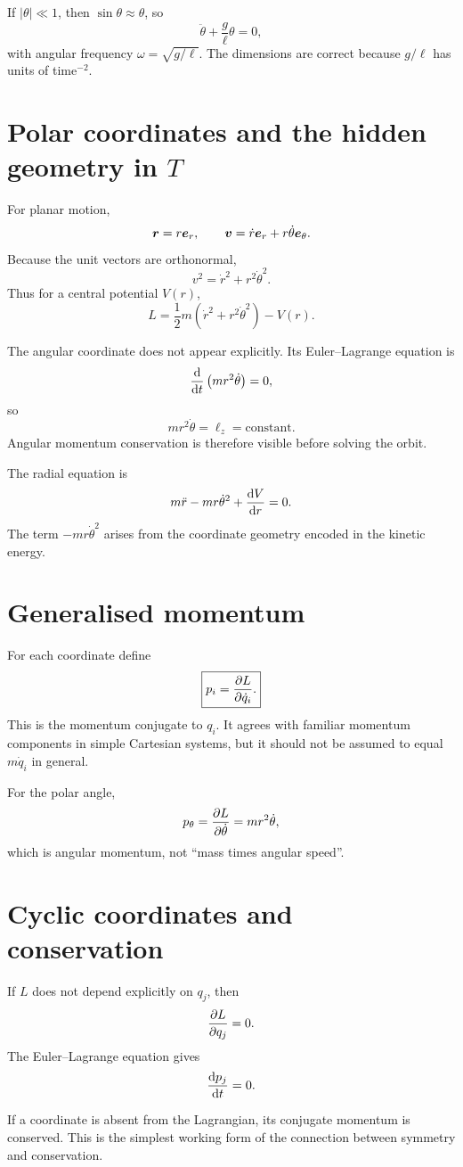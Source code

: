 \documentclass[11pt,a4paper]{article}
\begin{document}
\begin{checkBox}
If $|\theta|\ll1$, then $\sin\theta\approx\theta$, so
\[
\ddot\theta+\frac g\ell\theta=0,
\]
with angular frequency $\omega=\sqrt{g/\ell}$. The dimensions are correct because $g/\ell$ has units of time$^{-2}$.
\end{checkBox}

\section{Polar coordinates and the hidden geometry in $T$}

For planar motion,
\[
\bm{r}=r\bm{e}_r,
\qquad
\bm{v}=\dot r\bm{e}_r+r\dot\theta\bm{e}_\theta.
\]
Because the unit vectors are orthonormal,
\[
v^2=\dot r^2+r^2\dot\theta^2.
\]
Thus for a central potential $V(r)$,
\[
\boxed{L=\frac12m\left(\dot r^2+r^2\dot\theta^2\right)-V(r).}
\]

The angular coordinate does not appear explicitly. Its Euler--Lagrange equation is
\[
\frac{\mathop{}\!\mathrm d }{\mathop{}\!\mathrm d t}\left(mr^2\dot\theta\right)=0,
\]
so
\[
\boxed{mr^2\dot\theta=\ell_z=\text{constant}.}
\]
Angular momentum conservation is therefore visible before solving the orbit.

The radial equation is
\[
m\ddot r-mr\dot\theta^2+\frac{\mathop{}\!\mathrm d V}{\mathop{}\!\mathrm d r}=0.
\]
The term $-mr\dot\theta^2$ arises from the coordinate geometry encoded in the kinetic energy.

\section{Generalised momentum}

For each coordinate define
\[
\boxed{p_i=\frac{\partial L}{\partial \dot q_i}.}
\]
This is the momentum conjugate to $q_i$. It agrees with familiar momentum components in simple Cartesian systems, but it should not be assumed to equal $m\dot q_i$ in general.

For the polar angle,
\[
p_\theta=\frac{\partial L}{\partial \dot\theta}=mr^2\dot\theta,
\]
which is angular momentum, not ``mass times angular speed''.

\section{Cyclic coordinates and conservation}

If $L$ does not depend explicitly on $q_j$, then
\[
\frac{\partial L}{\partial q_j}=0.
\]
The Euler--Lagrange equation gives
\[
\frac{\mathop{}\!\mathrm d p_j}{\mathop{}\!\mathrm d t}=0.
\]

\begin{resultbox}
If a coordinate is absent from the Lagrangian, its conjugate momentum is conserved. This is the simplest working form of the connection between symmetry and conservation.
\end{resultbox}
\end{document}
